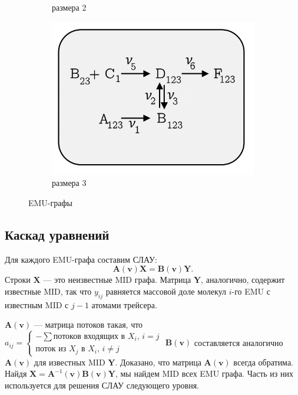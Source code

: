 \documentclass[14pt, a4paper]{extreport}
\begin{document}
\begin{figure}[b]
\begin{subfigure}{.3\linewidth}
		\caption{размера 2}
		\label {emu_graph_2}
	\end{subfigure}
	\begin{subfigure}{.3\linewidth}
		\includegraphics[width=1.2\linewidth]{EMU_graph_3.png}
		\caption{размера 3}
		\label {emu_graph_3}
	\end{subfigure}
	\caption{EMU-графы}
	\label{emu_graph}
\end{figure}

\clearpage

\subsection{Каскад уравнений}
Для каждого EMU-графа составим СЛАУ:
$$\mathbf{A}(\mathbf{v}) \mathbf{X} = \mathbf{B}(\mathbf{v}) \mathbf{Y}.$$
Строки $\mathbf{X}$ --- это неизвестные MID графа. Матрица $\mathbf{Y}$, аналогично, содержит известные MID, так что $y_{ij}$ равняется массовой доле молекул $i$-го EMU с известным MID с $j - 1$ атомами трейсера.

\noindent $\mathbf{A}(\mathbf{v})$ --- матрица потоков такая, что 
$a_{ij} = 
\begin{cases} 
	\text{$-\sum$потоков входящих в $X_i$, $i=j$}\\
	\text{поток из $X_j$ в $X_i$, $i\neq{}j$}
	\end{cases}
	$
 $\mathbf{B}(\mathbf{v})$ составляется аналогично $\mathbf{A}(\mathbf{v})$ для известных MID $\mathbf{Y}$. Доказано, что матрица $\mathbf{A}(\mathbf{v})$ всегда обратима\cite{anderson_1983}.
Найдя $\mathbf{X} = \mathbf{A}^{-1}(\mathbf{v})\mathbf{B}(\mathbf{v})\mathbf{Y}$, мы найдем MID всех EMU графа. Часть из них используется для решения СЛАУ следующего уровня.
\end{document}
